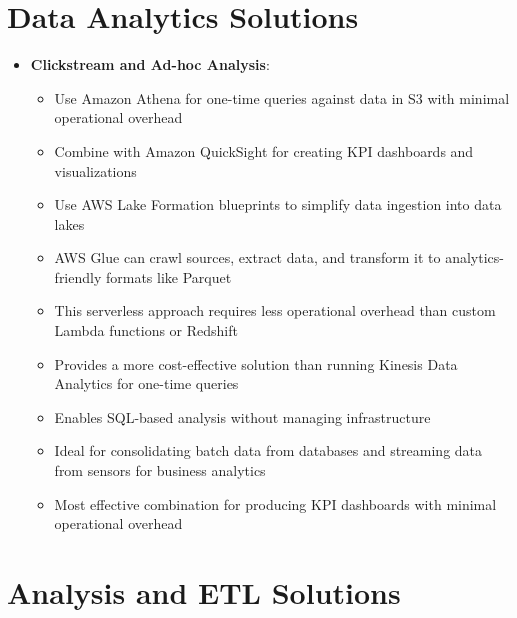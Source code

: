 \documentclass[11pt,a4paper]{report}
\begin{document}
\section{Data Analytics Solutions}

\begin{itemize}
  \item \textbf{Clickstream and Ad-hoc Analysis}:
\begin{itemize}
  \item Use Amazon Athena for one-time queries against data in S3 with minimal operational overhead
  \item Combine with Amazon QuickSight for creating KPI dashboards and visualizations
  \item Use AWS Lake Formation blueprints to simplify data ingestion into data lakes
  \item AWS Glue can crawl sources, extract data, and transform it to analytics-friendly formats like Parquet
  \item This serverless approach requires less operational overhead than custom Lambda functions or Redshift
  \item Provides a more cost-effective solution than running Kinesis Data Analytics for one-time queries
  \item Enables SQL-based analysis without managing infrastructure
  \item Ideal for consolidating batch data from databases and streaming data from sensors for business analytics
  \item Most effective combination for producing KPI dashboards with minimal operational overhead
\end{itemize}
\end{itemize}


\section{Analysis and ETL Solutions}
\end{document}
